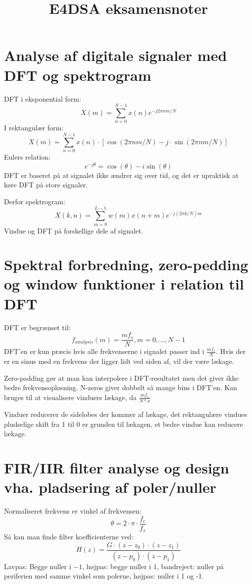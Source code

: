\documentclass{article}
\title{E4DSA eksamensnoter}
\begin{document}
\maketitle

\section{Analyse af digitale signaler med DFT og spektrogram}
DFT i eksponential form:
\begin{equation}
X(m)=\sum\limits_{n=0}^{N-1}x(n)e^{-j2\pi nm/N}
\end{equation}
I rektangulær form:
\begin{equation}
X(m)=\sum\limits_{n=0}^{N-1}x(n)\cdot \left[\cos(2\pi nm/N) - j\cdot \sin(2\pi nm/N)\right]
\end{equation}
Eulers relation:
\begin{equation}
e^{-j\theta} = \cos(\theta)-i\sin(\theta)
\end{equation}
DFT er baseret på at signalet ikke ændrer sig over tid, og det er upraktisk at køre DFT på store signaler.

Derfor spektrogram:
\begin{equation}
X(k,n)=\sum\limits_{m=0}^{L-1}w(m)x(n+m)e^{-j(2\pi k/N)m}
\end{equation}
Vindue og DFT på forskellige dele af signalet.

\section{Spektral forbredning, zero-pedding og window funktioner i relation til DFT}
DFT er begrænset til:
\begin{equation}
f_{analysis}(m)=\frac{mf_s}{N}, m=0,\dots,N-1
\end{equation}
DFT'en er kun præcis hvis alle frekvenserne i signalet passer ind i $\frac{mf_s}{N}$. Hvis der er en sinus med en frekvens der ligger lidt ved siden af, vil der være lækage.

Zero-padding gør at man kan interpolere i DFT-resultatet men det giver ikke bedre frekvensopløsning. N-zeros giver dobbelt så mange bins i DFT'en. Kan bruges til at visualisere vinduers lækage, da $\frac{mf_s}{N*x}$

Vinduer reducerer de sidelobes der kommer af lækage, det rektangulære vindues pludselige skift fra 1 til 0 er grunden til lækagen, et bedre vindue kan reducere lækage.

\section{FIR/IIR filter analyse og design vha. pladsering af poler/nuller}
Normaliseret frekvens er vinkel af frekvensen:
\begin{equation}
\theta = 2\cdot\pi\cdot\frac{f_c}{f_s}
\end{equation}
Så kan man finde filter koefficienterne ved:
$$H(z)=\frac{G\cdot (z-z_0)\cdot(z-z_1)}{(z-p_0)\cdot(z-p_1)}$$
Lavpas: Begge nuller i $-1$, højpas: begge nuller i $1$, bandreject: nuller på periferien med samme vinkel som polerne, højpas: nuller i 1 og -1.
\end{document}
